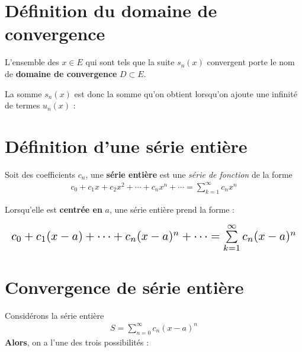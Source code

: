 \documentclass{report}
\begin{document}
\begin{multicols*}{3}
    \section{Définition du domaine de convergence}
    L'ensemble des $x \in E$ qui sont tels que la suite $s_n(x)$ 
    convergent porte le nom de  
    \textbf{\textcolor{myb}{domaine de convergence}} $D \subset E$.    

    La somme $s_n(x)$ est donc la somme qu'on obtient lorsqu'on 
    ajoute une infinité de termes $u_n(x)$ :
 


    \vspace{-2em}
    \section{Définition d'une série entière}

    Soit des coefficients $c_n$, 
    une \textbf{série entière} est une \textit{série de fonction}     
    de la forme 
    \begin{align*}
        c_0 + c_1x + c_2x^2 + \cdots + c_nx^n + \cdots = 
        \sum\limits_{k=1}^{\infty }  c_nx^n  
    \end{align*} 

    Lorsqu'elle est \textbf{centrée en} $a$, une série entière prend la forme : 

    \begin{align*}
        \resizebox{\linewidth}{!}{$
         c_0 + c_1(x - a) + \cdots + c_n(x - a)^n + \cdots = 
        \sum\limits_{k=1}^{\infty }  c_n(x - a)^n  
    $}
    \end{align*}    


    \vspace{-1.5em}
    \section{Convergence de série entière}
    \vspace{-0.5em}
        Considérons la série entière 
        \begin{align*}
           S = \sum_{n=0}^{\infty }c_n(x - a)^n 
        \end{align*}
        \textbf{Alors}, on a l'une des trois possibilités : 


\end{multicols*}
\end{document}

